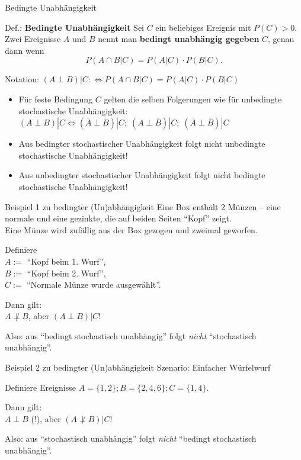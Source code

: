 \documentclass[
  10pt,
  ignorenonframetext,
]{beamer}
\providecommand{\tightlist}{%
  \setlength{\itemsep}{0pt}\setlength{\parskip}{0pt}}
\begin{document}
\begin{frame}{Bedingte Unabhängigkeit}
\protect\hypertarget{bedingte-unabhuxe4ngigkeit}{}
\begin{block}{Def.: \textbf{Bedingte Unabhängigkeit}}
\protect\hypertarget{def.-bedingte-unabhuxe4ngigkeit}{}
Sei \(C\) ein beliebiges Ereignis mit \(P(C)>0\).\\
Zwei Ereignisse \(A\) und \(B\) nennt man \textbf{bedingt unabhängig
gegeben} \(C\), genau dann wenn \[
P(A \cap B|C) = P(A|C) \cdot P(B|C).
\]
\end{block}

Notation: \((A \perp B)|C :\iff P(A \cap B|C) = P(A|C) \cdot P(B|C)\)

\begin{itemize}
\tightlist
\item
  Für feste Bedingung \(C\) gelten die selben Folgerungen wie für
  unbedingte stochastische Unabhängigkeit:\\
  \((A \perp B)|C \iff (\bar{A} \perp B)|C;\; (A \perp \bar B)|C;\; (\bar A \perp \bar B)|C\)
\item
  Aus bedingter stochastischer Unabhängigkeit folgt nicht unbedingte
  stochastische Unabhängigkeit!
\item
  Aus unbedingter stochastischer Unabhängigkeit folgt nicht bedingte
  stochastische Unabhängigkeit!
\end{itemize}
\end{frame}

\begin{frame}{Beispiel 1 zu bedingter (Un)abhängigkeit}
\protect\hypertarget{beispiel-1-zu-bedingter-unabhuxe4ngigkeit}{}
Eine Box enthält 2 Münzen -- eine normale und eine gezinkte, die auf
beiden Seiten ``Kopf'' zeigt.\\
Eine Münze wird zufällig aus der Box gezogen und zweimal geworfen.

Definiere\\
\(A :=\) ``Kopf beim 1. Wurf'',\\
\(B :=\) ``Kopf beim 2. Wurf'',\\
\(C:=\) ``Normale Münze wurde ausgewählt''.

Dann gilt:\\
\(A \not \perp B\), aber \((A \perp B)|C\)!

Also: aus ``bedingt stochastisch unabhängig'' folgt \emph{nicht}
``stochastisch unabhängig''.
\end{frame}

\begin{frame}{Beispiel 2 zu bedingter (Un)abhängigkeit}
\protect\hypertarget{beispiel-2-zu-bedingter-unabhuxe4ngigkeit}{}
Szenario: Einfacher Würfelwurf

Definiere Ereignisse \(A = \{1, 2\}; B = \{2, 4, 6\}; C = \{1, 4\}\).

Dann gilt:\\
\(A \perp B\) (!), aber \((A \not \perp B)|C\)!

Also: aus ``stochastisch unabhängig'' folgt \emph{nicht} ``bedingt
stochastisch unabhängig''.
\end{frame}
\end{document}
